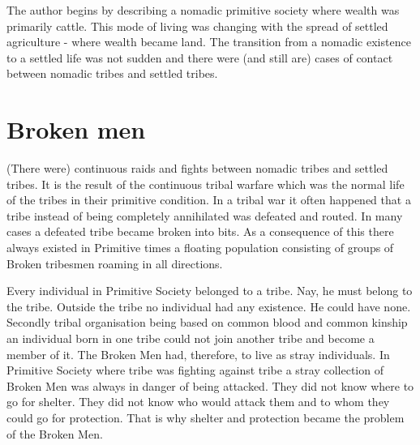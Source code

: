 \documentclass{article}
\begin{document}
The author begins by describing a nomadic primitive society where wealth was primarily cattle. This mode of living was changing with  the spread of settled agriculture - where wealth became land. The transition from a nomadic existence to a settled life was not sudden and there were (and still are) cases of contact between nomadic tribes and settled tribes.

\section{Broken men}
\begin{shadequote}
(There were) continuous raids and fights between nomadic tribes and settled tribes. It is the result of the continuous tribal warfare which was the normal life of the tribes in their primitive condition. In a tribal war it often happened that a tribe instead of being completely annihilated was defeated and routed. In many cases a defeated tribe became broken into bits. As a consequence of this there always existed in Primitive times a floating population consisting of groups of Broken tribesmen roaming in all directions.

Every individual in Primitive Society belonged to a tribe. Nay, he must belong to the tribe. Outside the tribe no individual had any existence. He could have none. Secondly tribal organisation being based on common blood and common kinship an individual born in one tribe could not join another tribe and become a member of it. The Broken Men had, therefore, to live as stray individuals. In Primitive Society where tribe was fighting against tribe a stray                                 collection of Broken Men was always in danger of being attacked. They did not know where to go for shelter. They did not know who would attack them and to whom they could go for protection. That is why shelter and protection became the problem of the Broken Men.


\end{shadequote}
\end{document}
